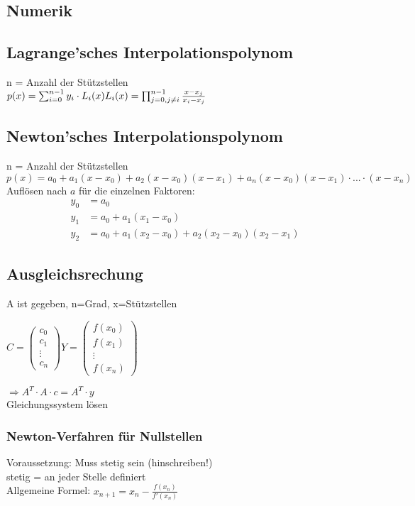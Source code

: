 \documentclass[a4paper, 8pt, landscape]{extarticle}
\let\oldsum\sum
\renewcommand{\sum}{\ensuremath{\textstyle\oldsum}}
\begin{document}
\begin{multicols*}{5}
	\section{Numerik}
		\subsection{Lagrange'sches Interpolationspolynom}
			n = Anzahl der Stützstellen\\
			$p(x) = \sum_{i=0}^{n-1} y_i \cdot L_i(x) \\
			L_i(x) = \prod_{j = 0, j \neq i}^{n-1} \frac{x - x_j}{x_i - x_j}$
		\subsection{Newton'sches Interpolationspolynom}
			n = Anzahl der Stützstellen\\
			$p(x) = a_0 + a_1(x - x_0) + a_2(x - x_0)(x - x_1) + a_n(x-x_0)(x - x_1)\cdot ... \cdot (x - x_n)$
			Auflösen nach $a$ für die einzelnen Faktoren:
			\begin{align*}
				y_0 &= a_0\\
				y_1 &= a_0 + a_1(x_1 - x_0)	\\
				y_2 &= a_0 + a_1(x_2 - x_0) + a_2(x_2 - x_0)(x_2 - x_1)
			\end{align*}
			\subsection{Ausgleichsrechung}
				A ist gegeben, n=Grad, x=Stützstellen
				\begin{multicols}{2}
					$C=\begin{pmatrix}
						c_0\\
						c_1\\
						\vdots\\
						c_n
					\end{pmatrix}
					Y=\begin{pmatrix}
						f(x_0)\\
						f(x_1)\\
						\vdots\\
						f(x_n)
					\end{pmatrix}$
				\end{multicols}
					$\Rightarrow A^T\cdot A\cdot c=A^T\cdot y$\\
					Gleichungssystem lösen
				
				
			\subsubsection{Newton-Verfahren für Nullstellen}
				Voraussetzung: Muss stetig sein (hinschreiben!)\\
				stetig = an jeder Stelle definiert\\
				Allgemeine Formel: $x_{n+1}=x_{n}-\frac{f(x_{n})}{f'(x_{n})}$ 

\end{multicols*}
\end{document}
